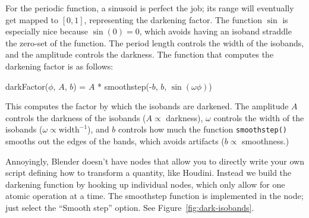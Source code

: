 \documentclass[10pt]{article}
\newcommand{\obj}[1]{\menu{\color{magenta} #1}}
\begin{document}
For the periodic function, a sinusoid is perfect the job; its range will eventually get mapped to $[0,1]$, representing the darkening factor. The function $\sin$ is especially nice because $\sin(0)=0$, which avoids having an isoband straddle the zero-set of the function. The period length controls the width of the isobands, and the amplitude controls the darkness. The function that computes the darkening factor is as follows:
\begin{center}
darkFactor($\phi$, $A$, $b$) = $A$ * smoothstep(-$b$, $b$, $\sin(\omega\phi)$)
\end{center}
This computes the factor by which the isobands are darkened. The amplitude $A$ controls the darkness of the isobands ($A\propto$ darkness), $\omega$ controls the width of the isobands ($\omega\propto \text{width}^{-1}$), and $b$ controls how much the function {\tt smoothstep()} smooths out the edges of the bands, which avoids artifacts ($b\propto$ smoothness.) 

Annoyingly, Blender doesn't have nodes that allow you to directly write your own script defining how to transform a quantity, like Houdini. Instead we build the darkening function by hooking up individual \obj{Math} nodes, which only allow for one atomic operation at a time. The smoothstep function is implemented in the \obj{Map Range} node; just select the ``Smooth step'' option. See Figure~\ref{fig:dark-isobands}.
\end{document}
